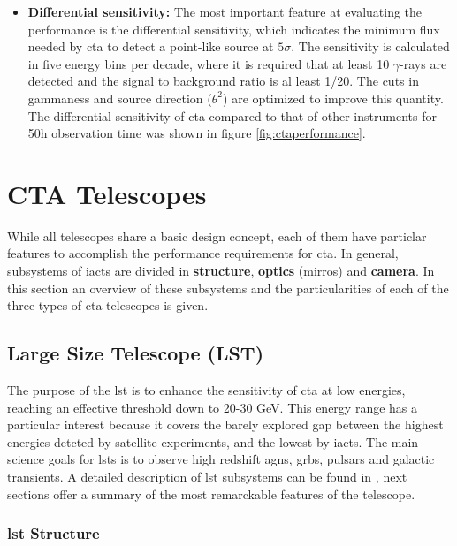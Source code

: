 \documentclass[main.tex]{subfiles}
\begin{document}
\begin{itemize}
\item \textbf{Differential sensitivity:} The most important feature at evaluating the performance is the differential sensitivity, which indicates the minimum flux needed by \gls{cta} to detect a point-like source at $5\sigma$. The sensitivity is calculated in five energy bins per decade, where it is required that at least 10 $\gamma$-rays are detected and the signal to background ratio is al least 1/20. The cuts in gammaness and source direction ($\theta^2$) are optimized to improve this quantity. The differential sensitivity of \gls{cta} compared to that of other instruments for 50h observation time was shown in figure \ref{fig:ctaperformance}.\\
  
\end{itemize}

\section{CTA Telescopes} \label{sec:ctatelescopes}

While all telescopes share a basic design concept, each of them have particlar features to accomplish the performance requirements for \gls{cta}. In general, subsystems of \glspl{iact} are divided in \textbf{structure}, \textbf{optics} (mirros) and \textbf{camera}. 
In this section an overview of these subsystems and the particularities of each of the three types of \gls{cta} telescopes is given. 

\subsection{Large Size Telescope (LST)}

The purpose of the \gls{lst} is to enhance the sensitivity of \gls{cta} at low energies, reaching an effective threshold down to 20-30 GeV. This energy range has a particular interest because it covers the barely explored gap between the highest energies detcted by satellite experiments, and the lowest by \glspl{iact}. The main science goals for \glspl{lst} is to observe high redshift \glspl{agn}, \glspl{grb}, pulsars and galactic transients. A detailed description of \gls{lst} subsystems can be found in \cite{2013LST}, next sections offer a summary of the most remarckable features of the telescope.\\

\subsubsection{\gls{lst} Structure}
\end{document}
